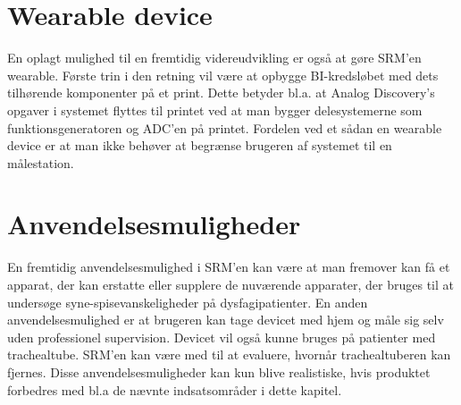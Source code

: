 \section{Wearable device}
En oplagt mulighed til en fremtidig videreudvikling er også at gøre SRM'en wearable. Første trin i den retning vil være at opbygge BI-kredsløbet med dets tilhørende komponenter på et print. Dette betyder bl.a. at Analog Discovery's opgaver i systemet flyttes til printet ved at man bygger delesystemerne som funktionsgeneratoren og ADC'en på printet. Fordelen ved et sådan en wearable device er at man ikke behøver at begrænse brugeren af systemet til en målestation.   


\section{Anvendelsesmuligheder}
En fremtidig anvendelsesmulighed i SRM'en kan være at man fremover kan få et apparat, der kan erstatte eller supplere de nuværende apparater, der bruges til at undersøge syne-spisevanskeligheder på dysfagipatienter. En anden anvendelsesmulighed er at brugeren kan tage devicet med hjem og måle sig selv uden professionel supervision. Devicet vil også kunne bruges på patienter med trachealtube. SRM'en kan være med til at evaluere, hvornår trachealtuberen kan fjernes. Disse anvendelsesmuligheder kan kun blive realistiske, hvis produktet forbedres med bl.a de nævnte indsatsområder i dette kapitel.     